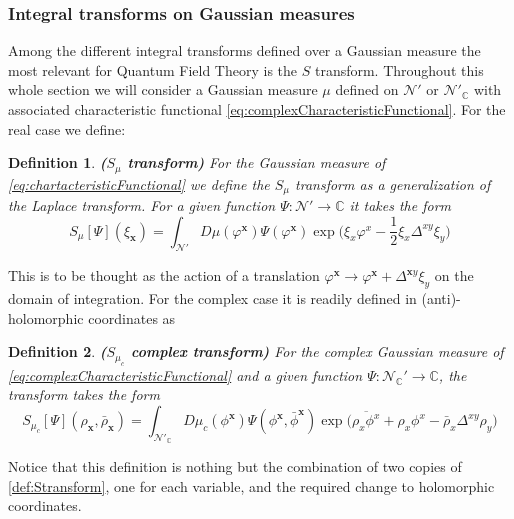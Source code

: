 \documentclass{elsarticle}%
\newtheorem{definition}{Definition}%
\begin{document}
\subsubsection{Integral transforms on Gaussian measures}
Among the different integral transforms defined over a Gaussian measure the most relevant for Quantum Field Theory is the $S$ transform. Throughout this whole section we will consider a Gaussian measure $\mu$ defined on $\mathcal{N}'$ or $\mathcal{N}'_\mathbb{C}$ with associated characteristic functional \eqref{eq:complexCharacteristicFunctional}. For the real case we define:

\begin{definition}
    \label{def:Stransform}{\bf ($S_\mu$ transform)} For the  Gaussian measure of \eqref{eq:chartacteristicFunctional} we define the $S_\mu$ transform as a generalization of the Laplace transform. For a given function $\Psi:\mathcal{N}'\to \mathbb{C}$ it takes the form 
    \begin{equation}
        \label{eq:stransform}
        S_\mu[\Psi](\xi_\mathbf{x})=\int_{\mathcal{N}'}D\mu(\varphi^{\mathbf{x}})\Psi(\varphi^{\mathbf{x}})\exp{\big(\xi_x\varphi^x-\frac12\xi_x\Delta^{xy}\xi_y\big)}
\end{equation}
\end{definition}
This is to be thought as the action of a translation $\varphi^{\mathbf{x}}\to\varphi^{\mathbf{x}}+\Delta^{\mathbf{x}y}\xi_y$ on the domain of integration. For the complex case it is readily defined in (anti)-holomorphic coordinates as 

\begin{definition}
    \label{def:SComplextransform}{\bf ($S_{\mu_c}$ complex transform)} For the complex Gaussian measure of \eqref{eq:complexCharacteristicFunctional} and a given function $\Psi:\mathcal{N}_{\mathbb{C}}'\to \mathbb{C}$, the transform takes the form 
    \begin{equation}
        \label{eq:stransformcomplex}
        S_{\mu_c}[\Psi](\rho_\mathbf{x},\bar\rho_\mathbf{x})=\int_{\mathcal{N}'_{\mathbb{C}}}D\mu_c(\phi^{\mathbf{x}})\Psi(\phi^{\mathbf{x}},\bar\phi^{\mathbf{x}})\exp{\big(\overline{{\rho}_x\phi^x}+{\rho}_x{\phi}^x-\bar\rho_x\Delta^{xy}\rho_y\big)}
        \end{equation}
\end{definition}

Notice that this definition is nothing but the combination of two copies of \autoref{def:Stransform}, one for each variable, and the required change to holomorphic coordinates.
\end{document}

